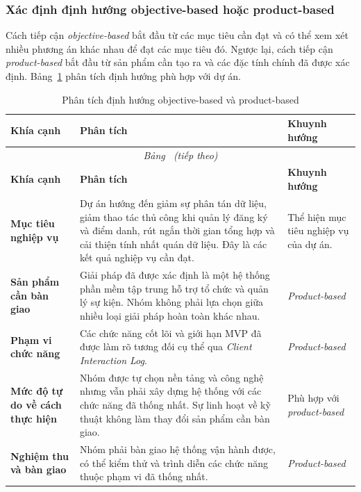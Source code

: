 \subsubsection{Xác định định hướng objective-based hoặc product-based}

Cách tiếp cận \textit{objective-based} bắt đầu từ các mục tiêu cần đạt và có thể xem xét nhiều phương án khác nhau để đạt các mục tiêu đó. Ngược lại, cách tiếp cận \textit{product-based} bắt đầu từ sản phẩm cần tạo ra và các đặc tính chính đã được xác định. Bảng~\ref{tab:objective-product-analysis} phân tích định hướng phù hợp với dự án.

{%
\setlength{\tabcolsep}{4pt}
\renewcommand{\arraystretch}{1.2}
\begin{longtable}{|p{3.5cm}|p{8.5cm}|p{2.7cm}|}
\caption{Phân tích định hướng objective-based và product-based}\label{tab:objective-product-analysis}\\
\hline
\textbf{Khía cạnh} & \textbf{Phân tích} & \textbf{Khuynh hướng} \\
\hline
\endfirsthead
\multicolumn{3}{c}{\textit{Bảng~\thetable{} (tiếp theo)}}\\
\hline
\textbf{Khía cạnh} & \textbf{Phân tích} & \textbf{Khuynh hướng} \\
\hline
\endhead
\hline
\endfoot
\hline
\endlastfoot
\textbf{Mục tiêu nghiệp vụ} & Dự án hướng đến giảm sự phân tán dữ liệu, giảm thao tác thủ công khi quản lý đăng ký và điểm danh, rút ngắn thời gian tổng hợp và cải thiện tính nhất quán dữ liệu. Đây là các kết quả nghiệp vụ cần đạt. & Thể hiện mục tiêu nghiệp vụ của dự án. \\
\hline
\textbf{Sản phẩm cần bàn giao} & Giải pháp đã được xác định là một hệ thống phần mềm tập trung hỗ trợ tổ chức và quản lý sự kiện. Nhóm không phải lựa chọn giữa nhiều loại giải pháp hoàn toàn khác nhau. & \textit{Product-based} \\
\hline
\textbf{Phạm vi chức năng} & Các chức năng cốt lõi và giới hạn MVP đã được làm rõ tương đối cụ thể qua \textit{Client Interaction Log}. & \textit{Product-based} \\
\hline
\textbf{Mức độ tự do về cách thực hiện} & Nhóm được tự chọn nền tảng và công nghệ nhưng vẫn phải xây dựng hệ thống với các chức năng đã thống nhất. Sự linh hoạt về kỹ thuật không làm thay đổi sản phẩm cần bàn giao. & Phù hợp với \textit{product-based} \\
\hline
\textbf{Nghiệm thu và bàn giao} & Nhóm phải bàn giao hệ thống vận hành được, có thể kiểm thử và trình diễn các chức năng thuộc phạm vi đã thống nhất. & \textit{Product-based} \\
\hline
\end{longtable}
}

